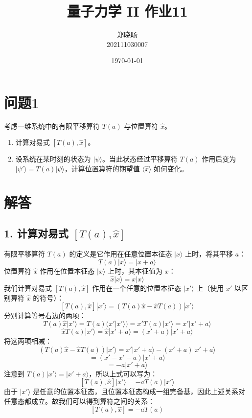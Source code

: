 \documentclass{article}
\begin{document}
\title{量子力学 II 作业11}
\author{郑晓旸 \\ 202111030007}
\date{\today}
\maketitle

\section*{问题1}
考虑一维系统中的有限平移算符 \(T(a)\) 与位置算符 \(\hat{x}\)。
\begin{enumerate}
    \item 计算对易式 \([T(a), \hat{x}]\)。
    \item 设系统在某时刻的状态为 \(|\psi\rangle\)。当此状态经过平移算符 \(T(a)\) 作用后变为 \(|\psi'\rangle = T(a)|\psi\rangle\)，计算位置算符的期望值 \(\langle \hat{x} \rangle\) 如何变化。
\end{enumerate}
\section*{解答}
\subsection*{1. 计算对易式 \([T(a), \hat{x}]\)}
有限平移算符 \(T(a)\) 的定义是它作用在任意位置本征态 \(|x\rangle\) 上时，将其平移 \(a\)：
\[ T(a)|x\rangle = |x+a\rangle \]
位置算符 \(\hat{x}\) 作用在位置本征态 \(|x\rangle\) 上时，其本征值为 \(x\)：
\[ \hat{x}|x\rangle = x|x\rangle \]
我们计算对易式 \([T(a), \hat{x}]\) 作用在一个任意的位置本征态 \(|x'\rangle\) 上（使用 \(x'\) 以区别算符 \(\hat{x}\) 的符号）：
\[ [T(a), \hat{x}]|x'\rangle = (T(a)\hat{x} - \hat{x}T(a))|x'\rangle \]
分别计算等号右边的两项：
\[ T(a)\hat{x}|x'\rangle = T(a)(x'|x'\rangle) = x'T(a)|x'\rangle = x'|x'+a\rangle \]
\[ \hat{x}T(a)|x'\rangle = \hat{x}|x'+a\rangle = (x'+a)|x'+a\rangle \]
将这两项相减：
\[ (T(a)\hat{x} - \hat{x}T(a))|x'\rangle = x'|x'+a\rangle - (x'+a)|x'+a\rangle \]
\[ = (x' - x' - a)|x'+a\rangle \]
\[ = -a|x'+a\rangle \]
注意到 \(T(a)|x'\rangle = |x'+a\rangle\)，所以上式可以写为：
\[ [T(a), \hat{x}]|x'\rangle = -a T(a)|x'\rangle \]
由于 \(|x'\rangle\) 是任意的位置本征态，且位置本征态构成一组完备基，因此上述关系对任意态都成立。故我们可以得到算符之间的关系：
\[ [T(a), \hat{x}] = -a T(a) \]
\end{document}
